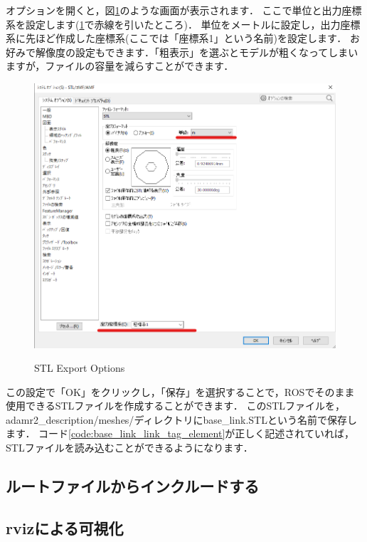 \documentclass[{../../master}]{subfiles}
\begin{document}
\noindent
オプションを開くと，図\ref{fig:base_link_stl_export_options}のような画面が表示されます．
ここで単位と出力座標系を設定します(\ref{fig:base_link_stl_export_options}で赤線を引いたところ)．
単位をメートルに設定し，出力座標系に先ほど作成した座標系(ここでは「座標系1」という名前)を設定します．
お好みで解像度の設定もできます．「粗表示」を選ぶとモデルが粗くなってしまいますが，ファイルの容量を減らすことができます．

\begin{figure}[ht]
  \centering
  \includegraphics[width=100truemm, clip]{images/base_link_stl_export_options.png}
  \label{fig:base_link_stl_export_options}
  \caption{STL Export Options}
\end{figure}

この設定で「OK」をクリックし，「保存」を選択することで，ROSでそのまま使用できるSTLファイルを作成することができます．
このSTLファイルを，\textsf{adamr2\_description/meshes/}ディレクトリに\textsf{base\_link.STL}という名前で保存します．
コード\ref{code:base_link_link_tag_element}が正しく記述されていれば，STLファイルを読み込むことができるようになります．

\subsection{ルートファイルからインクルードする}
\label{sec:base_link_include}

\subsection{\textsf{rviz}による可視化}
\end{document}
